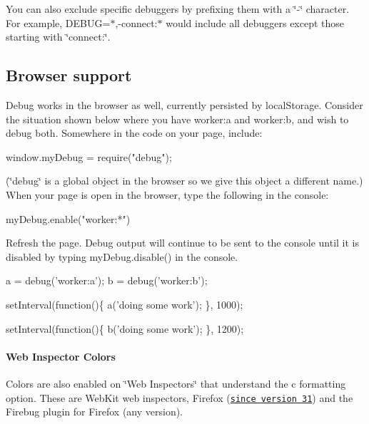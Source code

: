 You can also exclude specific debuggers by prefixing them with a \char`\"{}-\/\char`\"{} character. For example, {\ttfamily D\+E\+B\+UG=$\ast$,-\/connect\+:$\ast$} would include all debuggers except those starting with \char`\"{}connect\+:\char`\"{}.

\subsection*{Browser support}

Debug works in the browser as well, currently persisted by {\ttfamily local\+Storage}. Consider the situation shown below where you have {\ttfamily worker\+:a} and {\ttfamily worker\+:b}, and wish to debug both. Somewhere in the code on your page, include\+:


\begin{DoxyCode}
window.myDebug = require("debug");
\end{DoxyCode}


(\char`\"{}debug\char`\"{} is a global object in the browser so we give this object a different name.) When your page is open in the browser, type the following in the console\+:


\begin{DoxyCode}
myDebug.enable("worker:*")
\end{DoxyCode}


Refresh the page. Debug output will continue to be sent to the console until it is disabled by typing {\ttfamily my\+Debug.\+disable()} in the console.


\begin{DoxyCode}
a = debug('worker:a');
b = debug('worker:b');

setInterval(function()\{
  a('doing some work');
\}, 1000);

setInterval(function()\{
  b('doing some work');
\}, 1200);
\end{DoxyCode}


\paragraph*{Web Inspector Colors}

Colors are also enabled on \char`\"{}\+Web Inspectors\char`\"{} that understand the {\ttfamily c} formatting option. These are Web\+Kit web inspectors, Firefox (\href{https://hacks.mozilla.org/2014/05/editable-box-model-multiple-selection-sublime-text-keys-much-more-firefox-developer-tools-episode-31/}{\tt since version 31}) and the Firebug plugin for Firefox (any version).

